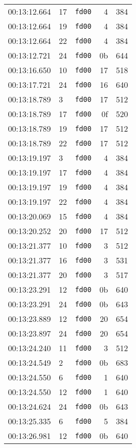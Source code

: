 \documentclass{article}
\begin{document}
\begin{longtable}{lllrr}
00:13:12.664 & 17 & \texttt{fd00} & 4 & 384 \\
00:13:12.664 & 19 & \texttt{fd00} & 4 & 384 \\
00:13:12.664 & 22 & \texttt{fd00} & 4 & 384 \\
00:13:12.721 & 24 & \texttt{fd00} & 0b & 644 \\
00:13:16.650 & 10 & \texttt{fd00} & 17 & 518 \\
00:13:17.721 & 24 & \texttt{fd00} & 16 & 640 \\
00:13:18.789 & 3 & \texttt{fd00} & 17 & 512 \\
00:13:18.789 & 17 & \texttt{fd00} & 0f & 520 \\
00:13:18.789 & 19 & \texttt{fd00} & 17 & 512 \\
00:13:18.789 & 22 & \texttt{fd00} & 17 & 512 \\
00:13:19.197 & 3 & \texttt{fd00} & 4 & 384 \\
00:13:19.197 & 17 & \texttt{fd00} & 4 & 384 \\
00:13:19.197 & 19 & \texttt{fd00} & 4 & 384 \\
00:13:19.197 & 22 & \texttt{fd00} & 4 & 384 \\
00:13:20.069 & 15 & \texttt{fd00} & 4 & 384 \\
00:13:20.252 & 20 & \texttt{fd00} & 17 & 512 \\
00:13:21.377 & 10 & \texttt{fd00} & 3 & 512 \\
00:13:21.377 & 16 & \texttt{fd00} & 3 & 531 \\
00:13:21.377 & 20 & \texttt{fd00} & 3 & 517 \\
00:13:23.291 & 12 & \texttt{fd00} & 0b & 640 \\
00:13:23.291 & 24 & \texttt{fd00} & 0b & 643 \\
00:13:23.889 & 12 & \texttt{fd00} & 20 & 654 \\
00:13:23.897 & 24 & \texttt{fd00} & 20 & 654 \\
00:13:24.240 & 11 & \texttt{fd00} & 3 & 512 \\
00:13:24.549 & 2 & \texttt{fd00} & 0b & 683 \\
00:13:24.550 & 6 & \texttt{fd00} & 1 & 640 \\
00:13:24.550 & 12 & \texttt{fd00} & 1 & 640 \\
00:13:24.624 & 24 & \texttt{fd00} & 0b & 643 \\
00:13:25.335 & 6 & \texttt{fd00} & 5 & 384 \\
00:13:26.981 & 12 & \texttt{fd00} & 0b & 640 \\

\end{longtable}
\end{document}
